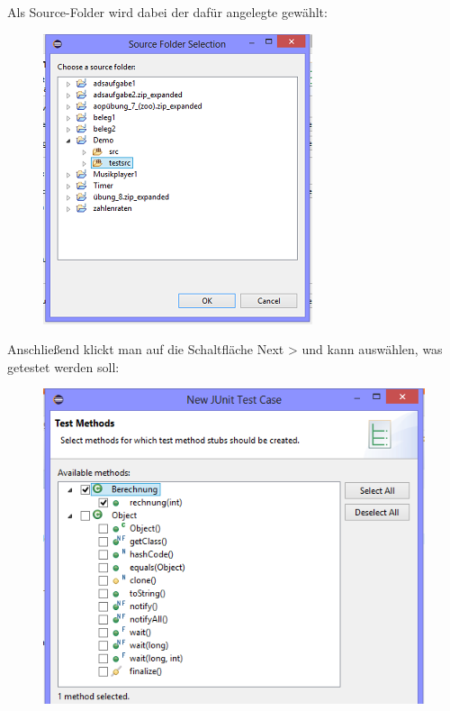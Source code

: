  Als Source-Folder wird dabei der dafür angelegte gewählt:
 \begin{figure}[H]
\centering
\includegraphics{Bilder/TRJU_3.png}
\end{figure}

Anschließend klickt man auf die Schaltfläche Next > und kann auswählen, was getestet werden soll:  
\begin{figure}[H]
\centering
\includegraphics{Bilder/TRJU_4.png}
\end{figure}

